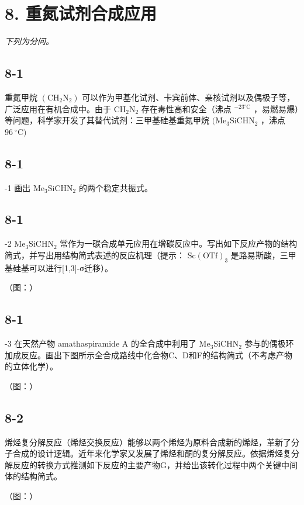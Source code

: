 \section*{8. 重氮试剂合成应用}
\textit{下列为分问。}

\subsection*{8-1}
重氮甲烷 $\left( \mathrm { C H } _ { 2 } \mathrm { N } _ { 2 } \right)$ 可以作为甲基化试剂、卡宾前体、亲核试剂以及偶极⼦等，⼴泛应⽤在有机合成中。由于 $\mathrm { C H _ { 2 } N _ { 2 } }$ 存在毒性⾼和安全（沸点 $^ { - 2 3 ^ { \circ } \mathrm { C } }$ ，易燃易爆）等问题，科学家开发了其替代试剂：三甲基硅基重氮甲烷 $\mathrm { ( M e _ { 3 } S i C H N _ { 2 } }$ ，沸点 $9 6 ~ ^ { \circ } \mathrm { C } )$

\subsection*{8-1}
-1 画出 $\mathrm { M e _ { 3 } S i C H N _ { 2 } }$ 的两个稳定共振式。

\subsection*{8-1}
-2 $\mathrm { M e _ { 3 } S i C H N _ { 2 } }$ 常作为⼀碳合成单元应⽤在增碳反应中。写出如下反应产物的结构简式，并写出⽤结构简式表述的反应机理（提⽰： $\mathrm { S c ( O T f ) _ { 3 } }$ 是路易斯酸，三甲基硅基可以进⾏[1,3]-σ迁移）。

（图：）

\subsection*{8-1}
-3 在天然产物 amathaspiramide A 的全合成中利⽤了 $\mathrm { M e _ { 3 } S i C H N _ { 2 } }$ 参与的偶极环加成反应。画出下图所⽰全合成路线中化合物C、D和F的结构简式（不考虑产物的⽴体化学）。

（图：）

\subsection*{8-2}
烯烃复分解反应（烯烃交换反应）能够以两个烯烃为原料合成新的烯烃，⾰新了分⼦合成的设计逻辑。近年来化学家⼜发展了烯烃和酮的复分解反应。依据烯烃复分解反应的转换⽅式推测如下反应的主要产物G，并给出该转化过程中两个关键中间体的结构简式。

（图：）
